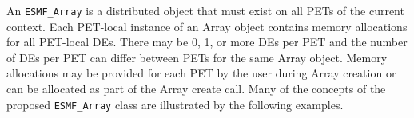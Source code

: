 
An {\tt ESMF\_Array} is a distributed object that must exist on all PETs of the current context. Each PET-local instance of an Array object contains memory allocations for all PET-local DEs. There may be 0, 1, or more DEs per PET and the number of DEs per PET can differ between PETs for the same Array object. Memory allocations may be provided for each PET by the user during Array creation or can be allocated as part of the Array create call. Many of the concepts of the proposed {\tt ESMF\_Array} class are illustrated by the following examples.
